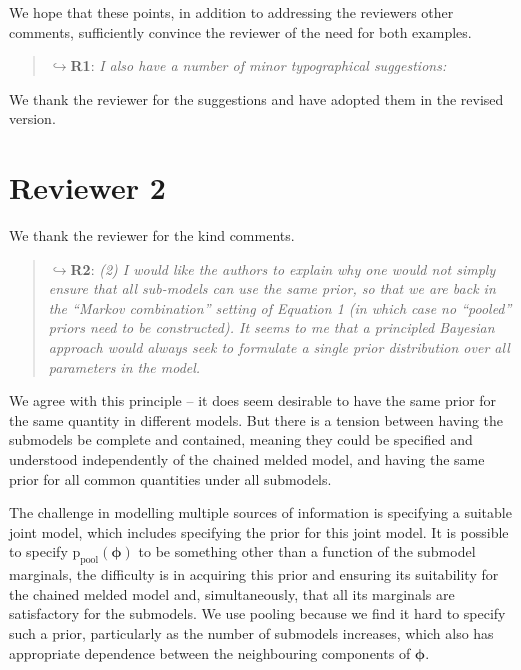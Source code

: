 \documentclass[
  10pt,
  a4paper,
]{article}
\newcommand{\pd}{\text{p}}
\begin{document}
We hope that these points, in addition to addressing the reviewers other
comments, sufficiently convince the reviewer of the need for both
examples.

\begin{quote}
\(\hookrightarrow\)\textbf{R1}: \emph{I also have a number of minor
typographical suggestions:}
\end{quote}

We thank the reviewer for the suggestions and have adopted them in the
revised version.

\hypertarget{reviewer-2}{%
\section*{Reviewer 2}\label{reviewer-2}}

We thank the reviewer for the kind comments.

\begin{quote}
\(\hookrightarrow\)\textbf{R2}: \emph{(2) I would like the authors to
explain why one would not simply ensure that all sub-models can use the
same prior, so that we are back in the ``Markov combination'' setting of
Equation 1 (in which case no ``pooled'' priors need to be constructed).
It seems to me that a principled Bayesian approach would always seek to
formulate a single prior distribution over all parameters in the model.}
\end{quote}

We agree with this principle -- it does seem desirable to have the same
prior for the same quantity in different models. But there is a tension
between having the submodels be complete and contained, meaning they
could be specified and understood independently of the chained melded
model, and having the same prior for all common quantities under all
submodels.

The challenge in modelling multiple sources of information is specifying
a suitable joint model, which includes specifying the prior for this
joint model. It is possible to specify
\(\pd_{\text{pool}}(\boldsymbol{\phi})\) to be something other than a
function of the submodel marginals, the difficulty is in acquiring this
prior and ensuring its suitability for the chained melded model and,
simultaneously, that all its marginals are satisfactory for the
submodels. We use pooling because we find it hard to specify such a
prior, particularly as the number of submodels increases, which also has
appropriate dependence between the neighbouring components of
\(\boldsymbol{\phi}\).
\end{document}
